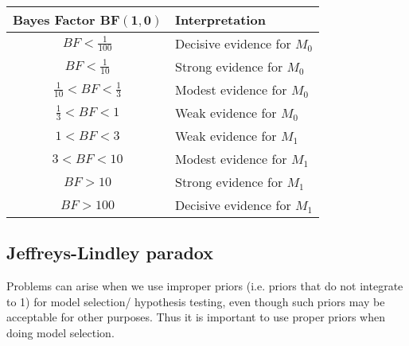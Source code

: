  

\begin{table}[h!]
	\begin{tabular}{|cl|}
		\hline
	\textbf{Bayes Factor} $\bm{BF(1,0)}$ & \textbf{Interpretation}\\
		\hline
		$BF<\frac{1}{100}$ & Decisive evidence for $M_{0}$\\
		\hline
		$BF<\frac{1}{10}$ & Strong evidence for $M_{0}$\\
		\hline
		$\frac{1}{10}<BF<\frac{1}{3}$ & Modest evidence for $M_{0}$\\
		\hline
		$\frac{1}{3}<BF<1$ & Weak evidence for $M_{0}$\\
		\hline
		$1<BF<3$ & Weak evidence for $M_{1}$\\
		\hline
		$3<BF<10$ & Modest evidence for $M_{1}$\\
		\hline
		$BF>10 $ &  Strong evidence for $M_{1}$\\
		\hline
		$BF>100$ & Decisive evidence for $M_{1}$\\
		\hline
	\end{tabular}
\end{table}


\subsection{Jeffreys-Lindley paradox}
Problems can arise when we use improper priors (i.e. priors that do not integrate to 1)
for model selection/ hypothesis testing, even though such priors may be acceptable for 
other purposes.  Thus it is important to use proper priors when doing model selection.
